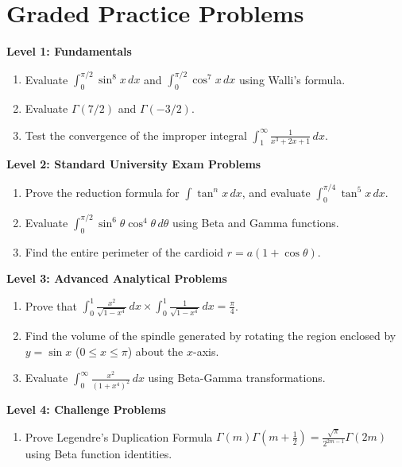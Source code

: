 \section{Graded Practice Problems}

\begin{practiceset}
\noindent\textbf{Level 1: Fundamentals}
\begin{enumerate}[leftmargin=1.5em]
    \item Evaluate $\int_0^{\pi/2} \sin^8 x\,dx$ and $\int_0^{\pi/2} \cos^7 x\,dx$ using Walli's formula.
    \item Evaluate $\Gamma(7/2)$ and $\Gamma(-3/2)$.
    \item Test the convergence of the improper integral $\int_1^\infty \frac{1}{x^3 + 2x + 1}\,dx$.
\end{enumerate}

\medskip
\noindent\textbf{Level 2: Standard University Exam Problems}
\begin{enumerate}[leftmargin=1.5em, start=4]
    \item Prove the reduction formula for $\int \tan^n x\,dx$, and evaluate $\int_0^{\pi/4} \tan^5 x\,dx$.
    \item Evaluate $\int_0^{\pi/2} \sin^6\theta \cos^4\theta\,d\theta$ using Beta and Gamma functions.
    \item Find the entire perimeter of the cardioid $r = a(1+\cos\theta)$.
\end{enumerate}

\medskip
\noindent\textbf{Level 3: Advanced Analytical Problems}
\begin{enumerate}[leftmargin=1.5em, start=7]
    \item Prove that $\int_0^1 \frac{x^2}{\sqrt{1-x^4}}\,dx \times \int_0^1 \frac{1}{\sqrt{1-x^4}}\,dx = \frac{\pi}{4}$.
    \item Find the volume of the spindle generated by rotating the region enclosed by $y = \sin x$ ($0 \le x \le \pi$) about the $x$-axis.
    \item Evaluate $\int_0^\infty \frac{x^2}{(1+x^4)^2}\,dx$ using Beta-Gamma transformations.
\end{enumerate}

\medskip
\noindent\textbf{Level 4: Challenge Problems}
\begin{enumerate}[leftmargin=1.5em, start=10]
    \item Prove Legendre's Duplication Formula $\Gamma(m)\Gamma\left(m+\frac{1}{2}\right) = \frac{\sqrt{\pi}}{2^{2m-1}}\Gamma(2m)$ using Beta function identities.
\end{enumerate}
\end{practiceset}

